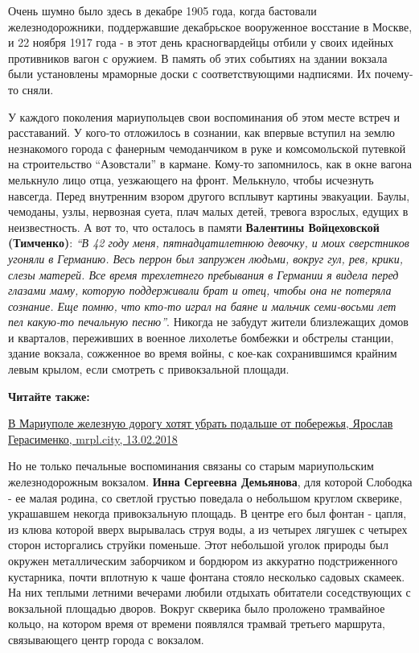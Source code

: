 
Очень шумно было здесь в декабре 1905 года, когда бастовали железнодорожники,
поддержавшие декабрьское вооруженное восстание в Москве, и 22 ноября 1917 года
- в этот день красногвардейцы отбили у своих идейных противников вагон с
оружием. В память об этих событиях на здании вокзала были установлены мраморные
доски с соответствующими надписями. Их почему-то сняли.

У каждого поколения мариупольцев свои воспоминания об этом месте встреч и
расставаний. У кого-то отложилось в сознании, как впервые вступил на землю
незнакомого города с фанерным чемоданчиком в руке и комсомольской путевкой на
строительство \enquote{Азовстали} в кармане. Кому-то запомнилось, как в окне вагона
мелькнуло лицо отца, уезжающего на фронт. Мелькнуло, чтобы исчезнуть навсегда.
Перед внутренним взором другого всплывут картины эвакуации. Баулы, чемоданы,
узлы, нервозная суета, плач малых детей, тревога взрослых, едущих в
неизвестность. А вот то, что осталось в памяти \textbf{Валентины Войцеховской
(Тимченко)}: \emph{\enquote{В 42 году меня, пятнадцатилетнюю девочку, и моих сверстников
угоняли в Германию. Весь перрон был запружен людьми, вокруг гул, рев, крики,
слезы матерей. Все время трехлетнего пребывания в Германии я видела перед
глазами маму, которую поддерживали брат и отец, чтобы она не потеряла сознание.
Еще помню, что кто-то играл на баяне и мальчик семи-восьми лет пел какую-то
печальную песню}}. Никогда не забудут жители близлежащих домов и кварталов,
переживших в военное лихолетье бомбежки и обстрелы станции, здание вокзала,
сожженное во время войны, с кое-как сохранившимся крайним левым крылом, если
смотреть с привокзальной площади.

\textbf{Читайте также:} 

\href{https://mrpl.city/news/view/v-mariupole-zheleznuyu-dorogu-hotyat-ubrat-podalshe-ot-poberezhya}{%
В Мариуполе железную дорогу хотят убрать подальше от побережья, Ярослав Герасименко, mrpl.city, 13.02.2018}

Но не только печальные воспоминания связаны со старым мариупольским
железнодорожным вокзалом. \textbf{Инна Сергеевна Демьянова}, для которой Слободка - ее
малая родина, со светлой грустью поведала о небольшом круглом скверике,
украшавшем некогда привокзальную площадь. В центре его был фонтан - цапля, из
клюва которой вверх вырывалась струя воды, а из четырех лягушек с четырех
сторон исторгались струйки поменьше. Этот небольшой уголок природы был окружен
металлическим заборчиком и бордюром из аккуратно подстриженного кустарника,
почти вплотную к чаше фонтана стояло несколько садовых скамеек. На них теплыми
летними вечерами любили отдыхать обитатели соседствующих с вокзальной площадью
дворов. Вокруг скверика было проложено трамвайное кольцо, на котором время от
времени появлялся трамвай третьего маршрута, связывающего центр города с
вокзалом.

